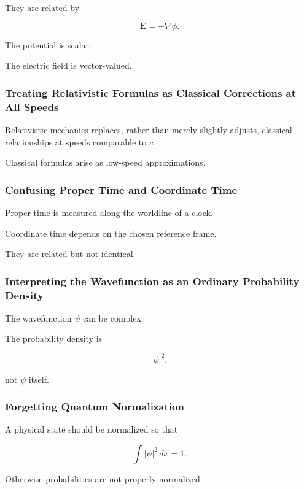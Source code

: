 They are related by

\[
\boxed{
\mathbf{E}
=
-\nabla\phi.
}
\]

The potential is scalar.

The electric field is vector-valued.

\subsubsection{Treating Relativistic Formulas as Classical Corrections at All Speeds}

Relativistic mechanics replaces, rather than merely slightly adjusts,
classical relationships at speeds comparable to \(c\).

Classical formulas arise as low-speed approximations.

\subsubsection{Confusing Proper Time and Coordinate Time}

Proper time is measured along the worldline of a clock.

Coordinate time depends on the chosen reference frame.

They are related but not identical.

\subsubsection{Interpreting the Wavefunction as an Ordinary Probability Density}

The wavefunction \(\psi\) can be complex.

The probability density is

\[
\boxed{
|\psi|^2,
}
\]

not \(\psi\) itself.

\subsubsection{Forgetting Quantum Normalization}

A physical state should be normalized so that

\[
\int |\psi|^2\,dx=1.
\]

Otherwise probabilities are not properly normalized.

